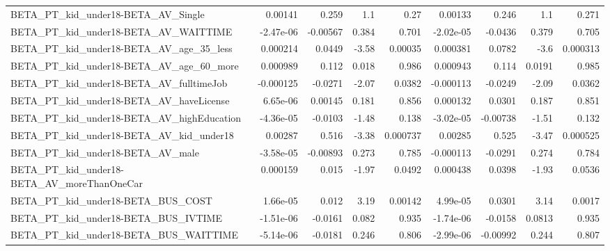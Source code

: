 \begin{tabular}{lrrrrrrrr}
BETA\_PT\_kid\_under18-BETA\_AV\_Single                 &     0.00141 &        0.259 &       1.1 &     0.27 &    0.00133 &       0.246 &          1.1 &         0.271 \\
BETA\_PT\_kid\_under18-BETA\_AV\_WAITTIME               &   -2.47e-06 &     -0.00567 &     0.384 &    0.701 &  -2.02e-05 &     -0.0436 &        0.379 &         0.705 \\
BETA\_PT\_kid\_under18-BETA\_AV\_age\_35\_less            &    0.000214 &       0.0449 &     -3.58 &  0.00035 &   0.000381 &      0.0782 &         -3.6 &      0.000313 \\
BETA\_PT\_kid\_under18-BETA\_AV\_age\_60\_more            &    0.000989 &        0.112 &     0.018 &    0.986 &   0.000943 &       0.114 &       0.0191 &         0.985 \\
BETA\_PT\_kid\_under18-BETA\_AV\_fulltimeJob            &   -0.000125 &      -0.0271 &     -2.07 &   0.0382 &  -0.000113 &     -0.0249 &        -2.09 &        0.0362 \\
BETA\_PT\_kid\_under18-BETA\_AV\_haveLicense            &    6.65e-06 &      0.00145 &     0.181 &    0.856 &   0.000132 &      0.0301 &        0.187 &         0.851 \\
BETA\_PT\_kid\_under18-BETA\_AV\_highEducation          &   -4.36e-05 &      -0.0103 &     -1.48 &    0.138 &  -3.02e-05 &    -0.00738 &        -1.51 &         0.132 \\
BETA\_PT\_kid\_under18-BETA\_AV\_kid\_under18            &     0.00287 &        0.516 &     -3.38 & 0.000737 &    0.00285 &       0.525 &        -3.47 &      0.000525 \\
BETA\_PT\_kid\_under18-BETA\_AV\_male                   &   -3.58e-05 &     -0.00893 &     0.273 &    0.785 &  -0.000113 &     -0.0291 &        0.274 &         0.784 \\
BETA\_PT\_kid\_under18-BETA\_AV\_moreThanOneCar         &    0.000159 &        0.015 &     -1.97 &   0.0492 &   0.000438 &      0.0398 &        -1.93 &        0.0536 \\
BETA\_PT\_kid\_under18-BETA\_BUS\_COST                  &    1.66e-05 &        0.012 &      3.19 &  0.00142 &   4.99e-05 &      0.0301 &         3.14 &        0.0017 \\
BETA\_PT\_kid\_under18-BETA\_BUS\_IVTIME                &   -1.51e-06 &      -0.0161 &     0.082 &    0.935 &  -1.74e-06 &     -0.0158 &       0.0813 &         0.935 \\
BETA\_PT\_kid\_under18-BETA\_BUS\_WAITTIME              &   -5.14e-06 &      -0.0181 &     0.246 &    0.806 &  -2.99e-06 &    -0.00992 &        0.244 &         0.807 \\

\end{tabular}
